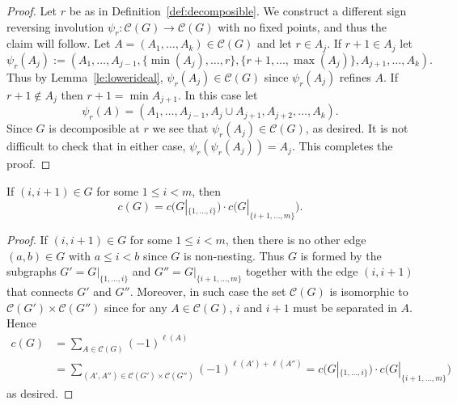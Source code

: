\documentclass[ALCO,ThmDefs,Unicode,epreuves]{cedram}
\begin{document}
\begin{proof}
Let $r$ be as in Definition~\ref{def:decomposible}. We construct a different sign reversing involution $\psi_r\colon \mathcal{C}(G)\to \mathcal{C}(G)$ with no fixed points, and thus the claim will follow. Let $A=(A_1,\ldots,A_k)\in \mathcal{C}(G)$ and let $r\in A_j$. If $r+1\in A_j$ let 
$$
\psi_r(A_j) :=(A_1,\ldots,A_{j-1},\{\min(A_j),\ldots,r\},\{r+1,\ldots,\max(A_j)\},A_{j+1},\ldots,A_k) .
$$
Thus by Lemma~\ref{le:lowerideal}, $\psi_r(A_j) \in \mathcal{C}(G)$ since $\psi_r(A_j)$ refines $A$. If $r+1\notin A_j$ then $r+1=\min A_{j+1}$. In this case let
$$\psi_r(A)=(A_1,\ldots,A_{j-1},A_j\cup A_{j+1},A_{j+2},\ldots,A_k).$$ Since $G$ is decomposible at $r$ we see that $\psi_r(A_j) \in \mathcal{C}(G) $, as desired. It is not difficult to check that in either case, $\psi_r(\psi_r(A_j))= A_j$. This completes the proof.
% 
\end{proof}

\begin{lemma}\label{le:shortedge}
 If $(i,i+1)\in G$ for some $1\le i<m$, then 
 $$ c(G)= c\big(G|_{\{1,\ldots, i\}}\big)\cdot c\big(G|_{\{i+1,\ldots, m\}}\big) .$$
\end{lemma}
\begin{proof} If $(i,i+1)\in G$ for some $1\le i<m$, then there is no other edge $(a,b)\in G$ with $a\le i<b$ since $G$ is non-nesting. Thus $G$ is formed by the subgraphs $G' = G|_{\{1,\ldots, i\}}$ and $G''=G|_{\{i+1,\ldots, m\}}$ together with the edge $(i,i+1)$ that connects $G'$ and $G''$. Moreover, in such case the set $\mathcal{C}(G)$ is isomorphic to $\mathcal{C}(G')\times \mathcal{C}(G'')$ since for any $A\in\mathcal{C}(G)$, $i$ and $i+1$ must be separated in $A$.
%
Hence
$$ 
\begin{aligned}
c(G) &= \sum_{A\in \mathcal{C}(G)} (-1)^{\ell(A)} 
\\
&= \sum_{(A',A'')\in \mathcal{C}(G')\times \mathcal{C}(G'')} (-1)^{\ell(A')+\ell(A'')}= c\big(G|_{\{1,\ldots, i\}}\big)\cdot c\big(G|_{\{i+1,\ldots, m\}}\big) 
\end{aligned}
$$
as desired. \end{proof}
\end{document}
